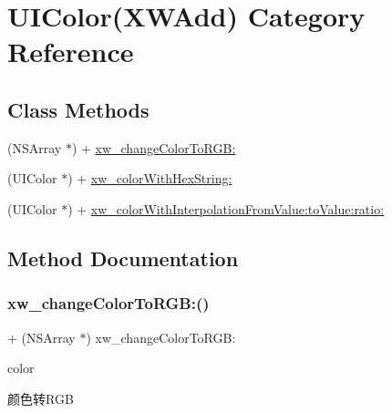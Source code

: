 \hypertarget{category_u_i_color_07_x_w_add_08}{}\section{U\+I\+Color(X\+W\+Add) Category Reference}
\label{category_u_i_color_07_x_w_add_08}
\subsection*{Class Methods}
\begin{DoxyCompactItemize}
\item 
(N\+S\+Array $\ast$) + \mbox{\hyperlink{category_u_i_color_07_x_w_add_08_ae308030ec1eab9b15b16cf68b482a134}{xw\+\_\+change\+Color\+To\+R\+G\+B\+:}}
\item 
(U\+I\+Color $\ast$) + \mbox{\hyperlink{category_u_i_color_07_x_w_add_08_a05efd91cc13231dbe939b29116777521}{xw\+\_\+color\+With\+Hex\+String\+:}}
\item 
(U\+I\+Color $\ast$) + \mbox{\hyperlink{category_u_i_color_07_x_w_add_08_a2877884fce624f702596fd46d31f9fbd}{xw\+\_\+color\+With\+Interpolation\+From\+Value\+:to\+Value\+:ratio\+:}}
\end{DoxyCompactItemize}


\subsection{Method Documentation}
\mbox{\label{category_u_i_color_07_x_w_add_08_ae308030ec1eab9b15b16cf68b482a134}} 
\subsubsection{\texorpdfstring{xw\+\_\+change\+Color\+To\+R\+G\+B\+:()}{xw\_changeColorToRGB:()}}
{\footnotesize\ttfamily + (N\+S\+Array $\ast$) xw\+\_\+change\+Color\+To\+R\+G\+B\+: \begin{DoxyParamCaption}\item[{(U\+I\+Color $\ast$)}]{color }\end{DoxyParamCaption}}

颜色转\+R\+GB \mbox{\label{category_u_i_color_07_x_w_add_08_a05efd91cc13231dbe939b29116777521}} 
